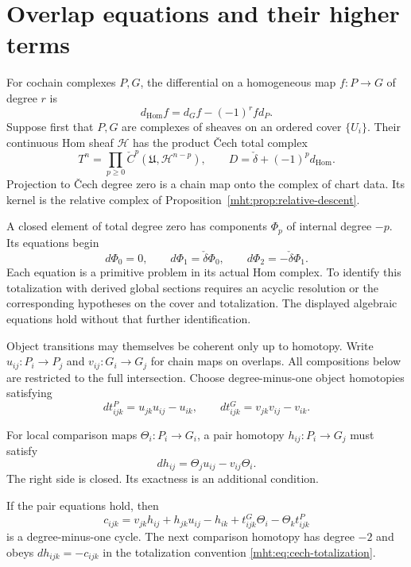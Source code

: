 \section{Overlap equations and their higher terms}

For cochain complexes $P,G$, the differential on a homogeneous map
$f:P\to G$ of degree $r$ is
\[
 d_{\mathrm{Hom}}f=d_Gf-(-1)^r f d_P.
\]
Suppose first that $P,G$ are complexes of sheaves on an ordered
cover $\{U_i\}$. Their continuous Hom sheaf $\mathcal H$ has the
product \v Cech total complex
\begin{equation}\label{mht:eq:cech-totalization}
 T^n=\prod_{p\geq0}\check C^p(\mathfrak U,\mathcal H^{n-p}),
 \qquad D=\check\delta+(-1)^p d_{\mathrm{Hom}}.
\end{equation}
Projection to \v Cech degree zero is a chain map onto the complex
of chart data. Its kernel is the relative complex of
Proposition~\ref{mht:prop:relative-descent}.

A closed element of total degree zero has components $\Phi_p$ of
internal degree $-p$. Its equations begin
\[
 d\Phi_0=0,\qquad d\Phi_1=\check\delta\Phi_0,
 \qquad d\Phi_2=-\check\delta\Phi_1.
\]
Each equation is a primitive problem in its actual Hom complex.
To identify this totalization with derived global sections requires
an acyclic resolution or the corresponding hypotheses on the cover
and totalization. The displayed algebraic equations hold without
that further identification.

Object transitions may themselves be coherent only up to homotopy.
Write $u_{ij}:P_i\to P_j$ and $v_{ij}:G_i\to G_j$ for chain maps
on overlaps. All compositions below are restricted to the full
intersection. Choose degree-minus-one object homotopies satisfying
\[
 dt^P_{ijk}=u_{jk}u_{ij}-u_{ik},\qquad
 dt^G_{ijk}=v_{jk}v_{ij}-v_{ik}.
\]

For local comparison maps $\Theta_i:P_i\to G_i$, a pair homotopy
$h_{ij}:P_i\to G_j$ must satisfy
\begin{equation}\label{mht:eq:descent-pair}
 dh_{ij}=\Theta_j u_{ij}-v_{ij}\Theta_i.
\end{equation}
The right side is closed. Its exactness is an additional condition.

\begin{lemma}\label{mht:lem:descent-triple}
If the pair equations hold, then
\begin{equation}\label{mht:eq:descent-triple}
 c_{ijk}=v_{jk}h_{ij}+h_{jk}u_{ij}-h_{ik}
              +t^G_{ijk}\Theta_i-\Theta_k t^P_{ijk}
\end{equation}
is a degree-minus-one cycle. The next comparison homotopy has degree
$-2$ and obeys $dh_{ijk}=-c_{ijk}$ in the totalization convention
\eqref{mht:eq:cech-totalization}.
\end{lemma}

